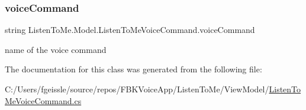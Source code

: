 \subsubsection{\texorpdfstring{voice\+Command}{voiceCommand}}
{\footnotesize\ttfamily string Listen\+To\+Me.\+Model.\+Listen\+To\+Me\+Voice\+Command.\+voice\+Command}



name of the voice command 



The documentation for this class was generated from the following file\+:\begin{DoxyCompactItemize}
\item 
C\+:/\+Users/fgeissle/source/repos/\+F\+B\+K\+Voice\+App/\+Listen\+To\+Me/\+View\+Model/\mbox{\hyperlink{_listen_to_me_voice_command_8cs}{Listen\+To\+Me\+Voice\+Command.\+cs}}\end{DoxyCompactItemize}
